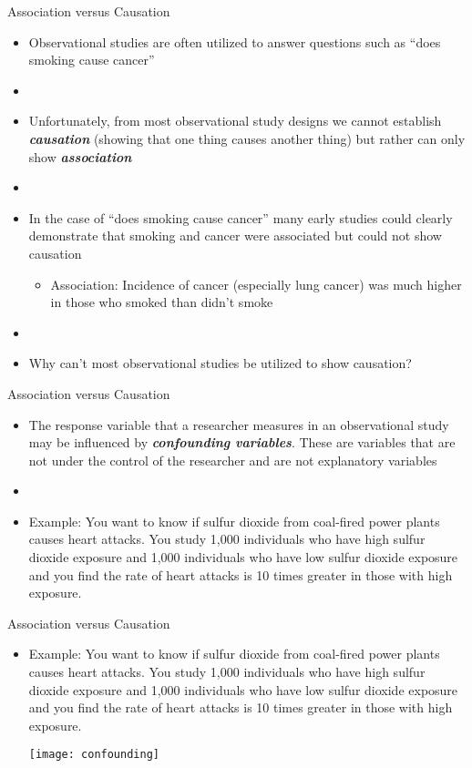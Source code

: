 \documentclass[xcolor=dvipsnames]{beamer}
\begin{document}
\begin{frame}{Association versus Causation}
	\begin{itemize}
		\item Observational studies are often utilized to answer questions such as ``does smoking cause cancer''
		\item[]
		\item Unfortunately, from most observational study designs we cannot establish \textbf{\emph{causation}} (showing that one thing causes another thing) but rather can only show \textbf{\emph{association}}
		\item[]
		\item In the case of ``does smoking cause cancer'' many early studies could clearly demonstrate that smoking and cancer were associated but could not show causation
		\begin{itemize}
			\item Association: Incidence of cancer (especially lung cancer) was much higher in those who smoked than didn't smoke
		\end{itemize}
		\item[]
		\item Why can't most observational studies be utilized to show causation?
	\end{itemize}
\end{frame}

\begin{frame}{Association versus Causation}
	\begin{itemize}
		\item The response variable that a researcher measures in an observational study may be influenced by \textbf{\emph{confounding variables}}. These are variables that are not under the control of the researcher and are not explanatory variables
		\item[]
		\item Example: You want to know if sulfur dioxide from coal-fired power plants causes heart attacks. You study 1,000 individuals who have high sulfur dioxide exposure and 1,000 individuals who have low sulfur dioxide exposure and you find the rate of heart attacks is 10 times greater in those with high exposure.
	\end{itemize}
\end{frame}

\begin{frame}{Association versus Causation}
\begin{itemize}
	\item Example: You want to know if sulfur dioxide from coal-fired power plants causes heart attacks. You study 1,000 individuals who have high sulfur dioxide exposure and 1,000 individuals who have low sulfur dioxide exposure and you find the rate of heart attacks is 10 times greater in those with high exposure.
	\begin{center}
		\texttt{[image: confounding]}
	\end{center}
\end{itemize}
\end{frame}
\end{document}
